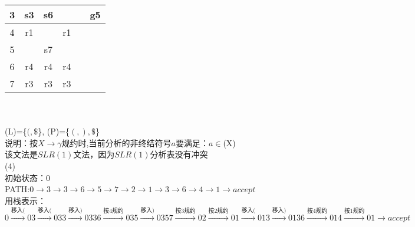 \documentclass[a4paper, justified]{tufte-handout}
\begin{document}
\begin{solution}
\begin{tabular}{|c|c|c|c|c|c|}
  3                        & s3                      & s6 &     &             & g5          \\ \hline
  4                        & r1                      &  & r1  &             &             \\ \hline
  5                        &                         & s7 &     &             &             \\ \hline
  6                        & r4                      & r4 & r4  &             &             \\ \hline
  7                        & r3                      & r3 & r3  &             &             \\ \hline
  \end{tabular}
  \\ \\
  \indent\indent \follow(L)=\{$(,\$ $\}, \follow(P)=\{$(,),\$ $\}\\
  \indent\indent 说明：按$X\to \gamma$规约时,当前分析的非终结符号$a$要满足：$a\in$\follow(X)\\
  \indent\indent 该文法是$SLR(1)$文法，因为$SLR(1)$分析表没有冲突\\ 
(4) \\
\indent 初始状态：0\\
\indent \textsc{PATH}:$0\to 3\to 3\to 6\to 5\to 7 \to 2\to 1\to 3 \to 6\to 4 \to 1\to accept$\\
\indent 用栈表示：$
  0\stackrel{\text{移入(}}{\longrightarrow} 03
  \stackrel{\text{移入(}}{\longrightarrow}  033
  \stackrel{\text{移入)}}{\longrightarrow}  0336
  \stackrel{\text{按4规约}}{\longrightarrow}  035
  \stackrel{\text{移入)}}{\longrightarrow}  0357
  \stackrel{\text{按3规约}}{\longrightarrow}  02
  \stackrel{\text{按2规约}}{\longrightarrow}  01
  \stackrel{\text{移入(}}{\longrightarrow}  013
  \stackrel{\text{移入)}}{\longrightarrow}  0136
  \stackrel{\text{按4规约}}{\longrightarrow}  014
  \stackrel{\text{按1规约}}{\longrightarrow}  01
  \to accept
  $
\end{solution}



\end{document}
